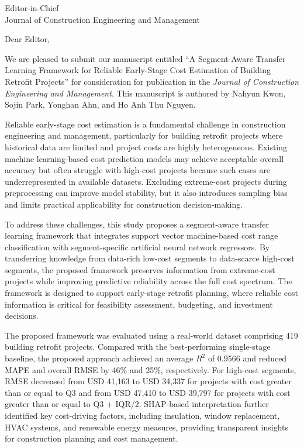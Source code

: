 \documentclass[11pt]{letter}
\date{July 2026}
\begin{document}
\begin{letter}{Editor-in-Chief\\Journal of Construction Engineering and Management}

\opening{Dear Editor,}

We are pleased to submit our manuscript entitled ``A Segment-Aware Transfer Learning Framework for Reliable Early-Stage Cost Estimation of Building Retrofit Projects'' for consideration for publication in the \textit{Journal of Construction Engineering and Management}. This manuscript is authored by Nahyun Kwon, Sojin Park, Yonghan Ahn, and Ho Anh Thu Nguyen.

Reliable early-stage cost estimation is a fundamental challenge in construction engineering and management, particularly for building retrofit projects where historical data are limited and project costs are highly heterogeneous. Existing machine learning-based cost prediction models may achieve acceptable overall accuracy but often struggle with high-cost projects because such cases are underrepresented in available datasets. Excluding extreme-cost projects during preprocessing can improve model stability, but it also introduces sampling bias and limits practical applicability for construction decision-making.

To address these challenges, this study proposes a segment-aware transfer learning framework that integrates support vector machine-based cost range classification with segment-specific artificial neural network regressors. By transferring knowledge from data-rich low-cost segments to data-scarce high-cost segments, the proposed framework preserves information from extreme-cost projects while improving predictive reliability across the full cost spectrum. The framework is designed to support early-stage retrofit planning, where reliable cost information is critical for feasibility assessment, budgeting, and investment decisions.

The proposed framework was evaluated using a real-world dataset comprising 419 building retrofit projects. Compared with the best-performing single-stage baseline, the proposed approach achieved an average \(R^2\) of 0.9566 and reduced MAPE and overall RMSE by 46\% and 25\%, respectively. For high-cost segments, RMSE decreased from USD 41,163 to USD 34,337 for projects with cost greater than or equal to Q3 and from USD 47,410 to USD 39,797 for projects with cost greater than or equal to Q3 + IQR/2. SHAP-based interpretation further identified key cost-driving factors, including insulation, window replacement, HVAC systems, and renewable energy measures, providing transparent insights for construction planning and cost management.


\end{letter}
\end{document}
